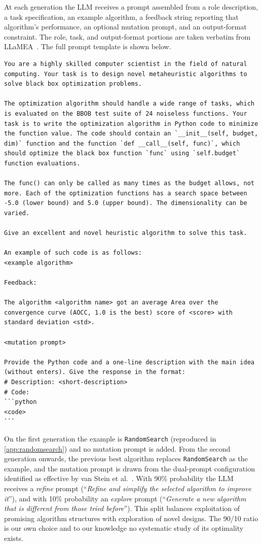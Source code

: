 At each generation the LLM receives a prompt assembled from a role description, a task specification, an example algorithm, a feedback string reporting that algorithm's performance, an optional mutation prompt, and an output-format constraint. The role, task, and output-format portions are taken verbatim from LLaMEA~\cite{vanStein2024LLaMEA}. The full prompt template is shown below.

\begin{lstlisting}[numbers=none,breakautoindent=false,breakindent=0pt,xleftmargin=0pt,basicstyle=\ttfamily\scriptsize]
You are a highly skilled computer scientist in the field of natural computing. Your task is to design novel metaheuristic algorithms to solve black box optimization problems.

The optimization algorithm should handle a wide range of tasks, which is evaluated on the BBOB test suite of 24 noiseless functions. Your task is to write the optimization algorithm in Python code to minimize the function value. The code should contain an `__init__(self, budget, dim)` function and the function `def __call__(self, func)`, which should optimize the black box function `func` using `self.budget` function evaluations.

The func() can only be called as many times as the budget allows, not more. Each of the optimization functions has a search space between -5.0 (lower bound) and 5.0 (upper bound). The dimensionality can be varied.

Give an excellent and novel heuristic algorithm to solve this task.

An example of such code is as follows:
<example algorithm>

Feedback:

The algorithm <algorithm name> got an average Area over the convergence curve (AOCC, 1.0 is the best) score of <score> with standard deviation <std>.

<mutation prompt>

Provide the Python code and a one-line description with the main idea (without enters). Give the response in the format:
# Description: <short-description>
# Code:
```python
<code>
```
\end{lstlisting}

On the first generation the example is \texttt{RandomSearch} (reproduced in \cref{app:randomsearch}) and no mutation prompt is added. From the second generation onwards, the previous best algorithm replaces \texttt{RandomSearch} as the example, and the mutation prompt is drawn from the dual-prompt configuration identified as effective by van Stein et al.~\cite{vanStein2025Behaviour}. With 90\% probability the LLM receives a \emph{refine} prompt (``\textit{Refine and simplify the selected algorithm to improve it}''), and with 10\% probability an \emph{explore} prompt (``\textit{Generate a new algorithm that is different from those tried before}''). This split balances exploitation of promising algorithm structures with exploration of novel designs. The 90/10 ratio is our own choice and to our knowledge no systematic study of its optimality exists.

